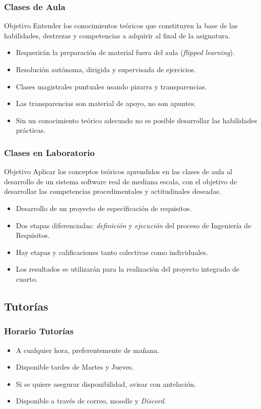 \documentclass[a4paper,slidestop,xcolor=pst,dvips,blue]{beamer}
\begin{document}
\begin{frame}
	\frametitle{Clases de Aula}
	\begin{block}{Objetivo}
        Entender los conocimientos teóricos que constituyen la base de las habilidades, destrezas y competencias a adquirir al final de la asignatura.
	\end{block}
	\begin{itemize}
        \item<2-> Requerirán la preparación de material fuera del aula (\emph{flipped learning}).
		\item<3-> Resolución autónoma, dirigida y supervisada de ejercicios.
		\item<4-> Clases magistrales puntuales usando pizarra y transparencias.
		\item<5-> Las \alert{transparencias} son material de apoyo, \alert{no son apuntes}.
		\item<6-> \alert{Sin un conocimiento teórico adecuado no es posible desarrollar las habilidades prácticas}.
	\end{itemize}
\end{frame}

\begin{frame}[c]
	\frametitle{Clases en Laboratorio}
	\begin{block}{Objetivo}
		Aplicar los conceptos teóricos aprendidos en las clases de aula al desarrollo de un sistema software real de mediana escala, con el objetivo
        de desarrollar las competencias procedimentales y actitudinales deseadas.
	\end{block}
	\begin{itemize}
        \item<2-> Desarrollo de un proyecto de especificación de requisitos.
		\item<3-> Dos etapas diferenciadas: \emph{definición} y \emph{ejecución} del proceso de Ingeniería de Requisitos.
        \item<4-> Hay etapas y calificaciones tanto colectivas como individuales.
        \item<5-> Los resultados se utilizarán para la realización del proyecto integrado de cuarto.
	\end{itemize}
\end{frame}

\subsection{Tutorías}

\begin{frame}[c]
	\frametitle{Horario Tutorías}
    \begin{itemize}[<+->]
        \item A cualquier hora, preferentemente de mañana.
        \item Disponible tardes de Martes y Jueves.
        \item Si se quiere asegurar disponibilidad, avisar con antelación.
        \item Disponible a través de correo, moodle y \emph{Discord}.
	\end{itemize}
\end{frame}
\end{document}
